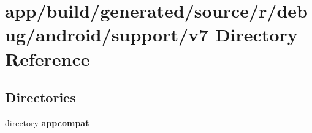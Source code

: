 \section{app/build/generated/source/r/debug/android/support/v7 Directory Reference}
\label{dir_1a38b4f7ee268a413d037550eec4446d}
\subsection*{Directories}
\begin{DoxyCompactItemize}
\item 
directory {\bf appcompat}
\end{DoxyCompactItemize}
